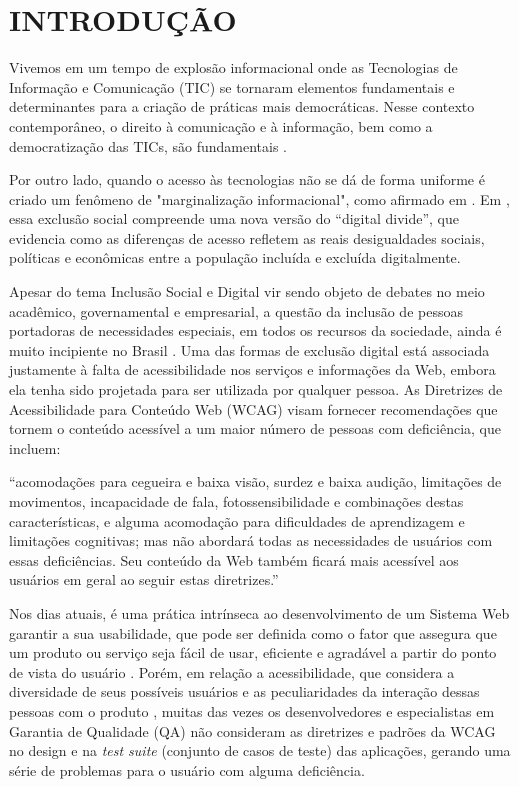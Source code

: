 \documentclass[
	12pt,				%
	openright,			%
	oneside,			%
	a4paper,			%
	chapter=TITLE,		%
	section=TITLE,		%
	subsection=TITLE,	%
	subsubsection=TITLE,%
	english,			%
	brazil				%
	]{abntex2}
\theoremstyle{definition}
\begin{document}
\chapter{INTRODUÇÃO}

Vivemos em um tempo de explosão informacional onde as Tecnologias de Informação e Comunicação (TIC) se tornaram elementos fundamentais e determinantes para a criação de práticas mais democráticas. Nesse contexto contemporâneo, o direito à comunicação e à informação, bem como a democratização das TICs, são fundamentais \cite{morigireencantamento}.

Por outro lado, quando o acesso às tecnologias não se dá de forma uniforme é criado um fenômeno de "marginalização informacional", como afirmado em  \cite{matellart2002historia}. Em \cite{esteves2010novos}, essa exclusão social compreende uma nova versão do “digital divide”, que evidencia como as diferenças de acesso refletem as reais desigualdades sociais, políticas e econômicas entre a população incluída e excluída digitalmente.

Apesar do tema Inclusão Social e Digital vir sendo objeto de debates no meio acadêmico, governamental e empresarial, a questão da inclusão de pessoas portadoras de necessidades especiais, em todos os recursos da sociedade, ainda é muito incipiente no Brasil \cite{maciel2000portadores}. Uma das formas de exclusão digital está associada justamente à falta de acessibilidade nos serviços e informações da Web, embora ela tenha sido projetada para ser utilizada por qualquer pessoa. As Diretrizes de Acessibilidade para Conteúdo Web (WCAG) visam fornecer recomendações que tornem o conteúdo acessível a um maior número de pessoas com deficiência, que incluem:

\begin{citacao}
“acomodações para cegueira e baixa visão, surdez e baixa audição, limitações de movimentos, incapacidade de fala, fotossensibilidade e combinações destas características, e alguma acomodação para dificuldades de aprendizagem e limitações cognitivas; mas não abordará todas as necessidades de usuários com essas deficiências. Seu conteúdo da Web também ficará mais acessível aos usuários em geral ao seguir estas diretrizes.” \cite{caldwell2008web}
\end{citacao}

Nos dias atuais, é uma prática intrínseca ao desenvolvimento de um Sistema Web garantir a sua usabilidade, que pode ser definida como o fator que assegura que um produto ou serviço seja fácil de usar, eficiente e agradável a partir do ponto de vista do usuário \cite{sharp2005design}. Porém, em relação a acessibilidade, que considera a diversidade de seus possíveis usuários e as peculiaridades da interação dessas pessoas com o produto \cite{torres2004conteudos}, muitas das vezes os desenvolvedores e especialistas em Garantia de Qualidade (QA) não consideram as diretrizes e padrões da WCAG no design e na \textit{test suite} (conjunto de casos de teste) das aplicações, gerando uma série de problemas para o usuário com alguma deficiência.
\end{document}
